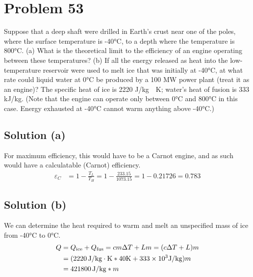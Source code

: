 \documentclass[12pt]{article}
\newcommand{\E}[1]{\times 10^{#1}}
\begin{document}
    \pagebreak
    \section{Problem 53}
        Suppose that a deep shaft were drilled in Earth's crust near one of the poles, where the surface temperature is -40\unit{\celsius}, to a depth where the temperature is 800°C. 
        (a) What is the theoretical limit to the efficiency of an engine operating between these temperatures?
        (b) If all the energy released as heat into the low-temperature reservoir were used to melt ice that was initially at -40\unit{\celsius}, at what rate could liquid water at 0\unit{\celsius} be produced by a 100 MW power plant (treat it as an engine)? 
        The specific heat of ice is 2220 \unit{\joule/\kilo\gram\cdot\kelvin}; water's heat of fusion is 333 \unit{\kilo\joule/\kilo\gram}. 
        (Note that the engine can operate only between 0\unit{\celsius} and 800\unit{\celsius} in this case. 
        Energy exhausted at -40\unit{\celsius} cannot warm anything above -40\unit{\celsius}.)

        \subsection{Solution (a)}
            For maximum efficiency, this would have to be a Carnot engine, and as such would have a calculatable (Carnot) efficiency. 
            \begin{align}
                \varepsilon_C   &=  1 - \frac{T_L}{T_H}
                    =   1 - \frac{233.15}{1073.15}
                    =   1 - 0.21726
                    =   \boxed{0.783}
            \end{align}

        \subsection{Solution (b)}
            We can determine the heat required to warm and melt an unspecified mass of ice from -40\unit{\celsius} to 0\unit{\celsius}. 
            \begin{align}
                Q   &=  Q_{\rm ice} + Q_{\rm fus}
                    =   cm\Delta T + Lm
                    =   (c\Delta T + L)m\\
                    &=  (2220\,\unit{\joule/\kilo\gram\cdot\kelvin} * 40\unit\kelvin + 333\E{3} \unit{\joule/\kilo\gram})m\\
                    &=  421800\,\unit{\joule/\kilo\gram} * m
            \end{align}
\end{document}
